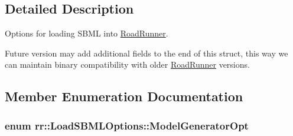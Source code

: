 \subsection{Detailed Description}
Options for loading S\-B\-M\-L into \hyperlink{classrr_1_1_road_runner}{Road\-Runner}.

Future version may add additional fields to the end of this struct, this way we can maintain binary compatibility with older \hyperlink{classrr_1_1_road_runner}{Road\-Runner} versions. 

\subsection{Member Enumeration Documentation}
\hypertarget{structrr_1_1_load_s_b_m_l_options_a7b6ca6fc32892dbe782f3eb718762ad6}{
\subsubsection[{Model\-Generator\-Opt}]{\setlength{\rightskip}{0pt plus 5cm}enum {\bf rr\-::\-Load\-S\-B\-M\-L\-Options\-::\-Model\-Generator\-Opt}}}\label{structrr_1_1_load_s_b_m_l_options_a7b6ca6fc32892dbe782f3eb718762ad6}
